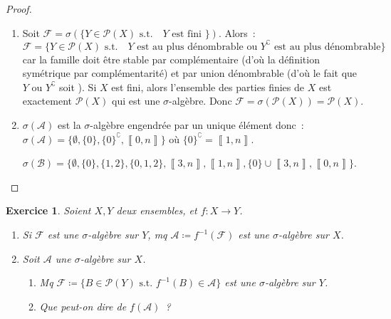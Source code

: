 \documentclass{article}
\newtheorem{ex}{Exercice}[section]
\newcommand{\st}{\text{ s.t. }}
\newcommand{\C}{\complement}
\newcommand{\intint}[2]{\left\llbracket#1, #2\right\rrbracket}
\begin{document}
\begin{proof}~
\begin{enumerate}
	\item Soit $\mathcal F = \sigma(\{Y \in \mathcal P(X) \st \text{ $Y$ est fini }\})$. Alors~:
	\[\mathcal F = \{Y \in \mathcal P(X) \st \text{ $Y$ est au plus dénombrable ou $Y^\C$ est au plus dénombrable}\}\]
	car la famille doit être stable par complémentaire (d'où la définition symétrique par complémentarité) et par union dénombrable (d'où le fait
	que $Y$ ou $Y^\C$ soit ). Si $X$ est fini, alors l'ensemble des parties finies de $X$ est exactement $\mathcal P(X)$
	qui est une $\sigma$-algèbre. Donc $\mathcal F = \sigma(\mathcal P(X)) = \mathcal P(X)$.
	\item $\sigma(\mathcal A)$ est la $\sigma$-algèbre engendrée par un unique élément donc~: $\sigma(\mathcal A) = \{\emptyset, \{0\}, \{0\}^\C, \intint 0n\}$
	où $\{0\}^\C = \intint 1n$.

	$\sigma(\mathcal B) = \{\emptyset, \{0\}, \{1, 2\}, \{0, 1, 2\}, \intint 3n, \intint 1n, \{0\} \cup \intint 3n, \intint 0n\}$.
\end{enumerate}
\end{proof}

\begin{ex} Soient $X, Y$ deux ensembles, et $f : X \to Y$.
\begin{enumerate}
	\item Si $\mathcal F$ est une $\sigma$-algèbre sur $Y$, mq $\mathcal A \coloneqq f^{-1}(\mathcal F)$ est une $\sigma$-algèbre sur $X$.
	\item Soit $\mathcal A$ une $\sigma$-algèbre sur $X$.
	\begin{enumerate}
		\item Mq $\mathcal F \coloneqq \{B \in \mathcal P(Y) \st f^{-1}(B) \in \mathcal A\}$ est une $\sigma$-algèbre sur $Y$.
		\item Que peut-on dire de $f(\mathcal A)$~?
	\end{enumerate}
\end{enumerate}
\end{ex}
\end{document}
